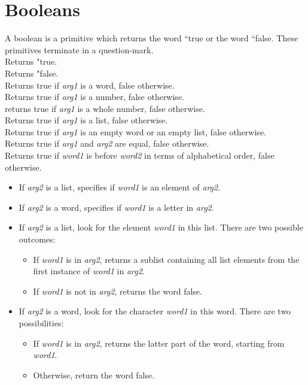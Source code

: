 \section{Booleans}

A boolean is a primitive which returns the word {}``true or the word
{}``false. These primitives terminate in a question-mark.\\
 Returns "true.\\
 Returns "false.\\
 Returns true if \textit{arg1} is a word, false otherwise.\\
Returns true if \textit{arg1} is a number, false otherwise.\\
returns true if \textit{arg1} is a whole number, false otherwise.\\
Returns true if \textit{arg1} is a list, false otherwise.\\
Returns true if \textit{arg1} is an empty word or an empty list, false otherwise.\\
Returns true if \textit{arg1} and \textit{arg2} are equal, false otherwise.\\
Returns true if \textit{word1} is before \textit{word2} in terms of alphabetical order, false otherwise.\\
\begin{itemize}
 \item If \textit{arg2} is a list, specifies if \textit{word1} is an element of \textit{arg2}.
 \item If \textit{arg2} is a word, specifies if \textit{word1} is a letter in \textit{arg2}.
\end{itemize}
\noindent
{}
\begin{itemize}
 \item If \textit{arg2} is a list, look for the element \textit{word1} in this list.  There are two possible outcomes:
	\begin{itemize}
 	\item If \textit{word1} is in \textit{arg2}, returns a sublist containing all list elements from the first instance of \textit{word1} in \textit{arg2}.
 	\item  If \textit{word1} is not in \textit{arg2}, returns the word false.
	\end{itemize}
 
\item 	If \textit{arg2} is a word, look for the character \textit{word1} in this word.  There are two possibilities:
	\begin{itemize}
 	\item  If \textit{word1} is in \textit{arg2}, returns the latter part of the word, starting from \textit{word1}.
 	\item  Otherwise, return the word false.
	\end{itemize}
\end{itemize}
